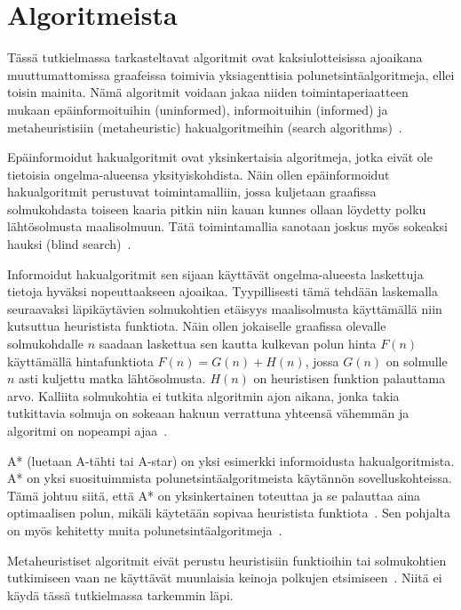 \section{Algoritmeista}\label{algoritmeista}
Tässä tutkielmassa tarkasteltavat algoritmit ovat kaksiulotteisissa 
ajoaikana muuttumattomissa graafeissa toimivia yksiagenttisia 
polunetsintäalgoritmeja, ellei toisin mainita. Nämä algoritmit voidaan jakaa 
niiden toimintaperiaatteen mukaan epäinformoituihin (uninformed), 
informoituihin (informed) ja metaheuristisiin (metaheuristic) 
hakualgoritmeihin (search algorithms)~\cite{applSciLawande}.\par
	Epäinformoidut hakualgoritmit ovat yksinkertaisia algoritmeja, jotka 
eivät ole tietoisia ongelma-alueensa yksityiskohdista. Näin ollen 
epäinformoidut hakualgoritmit perustuvat toimintamalliin, jossa kuljetaan 
graafissa solmukohdasta toiseen kaaria pitkin niin kauan kunnes ollaan 
löydetty polku lähtösolmusta maalisolmuun. Tätä toimintamallia sanotaan 
joskus myös sokeaksi hauksi (blind search)~\cite{applSciLawande}.\par
	Informoidut hakualgoritmit sen sijaan käyttävät ongelma-alueesta 
laskettuja tietoja hyväksi nopeuttaakseen ajoaikaa. Tyypillisesti tämä 
tehdään laskemalla seuraavaksi läpikäytävien solmukohtien etäisyys 
maalisolmusta käyttämällä niin kutsuttua heuristista funktiota. Näin ollen 
jokaiselle graafissa olevalle solmukohdalle $n$ saadaan laskettua sen 
kautta kulkevan polun hinta $F(n)$ käyttämällä hintafunktiota 
$F(n) = G(n) + H(n)$, jossa $G(n)$ on solmulle $n$ asti kuljettu matka 
lähtösolmusta. $H(n)$ on heuristisen funktion palauttama arvo. 
Kalliita solmukohtia ei tutkita algoritmin ajon aikana, jonka takia 
tutkittavia solmuja on sokeaan hakuun verrattuna yhteensä vähemmän ja 
algoritmi on nopeampi ajaa~\cite{applSciLawande}.\par
	A* (luetaan A-tähti tai A-star) on yksi esimerkki informoidusta 
hakualgoritmista. A* on yksi suosituimmista polunetsintäalgoritmeista 
käytännön sovelluskohteissa. Tämä johtuu siitä, että A* on yksinkertainen 
toteuttaa ja se palauttaa aina optimaalisen polun, mikäli käytetään 
sopivaa heuristista funktiota~\cite{MathewAndMalathy}. Sen pohjalta on 
myös kehitetty muita polunetsintäalgoritmeja~\cite{applSciLawande}.\par
	Metaheuristiset algoritmit eivät perustu heuristisiin funktioihin tai 
solmukohtien tutkimiseen vaan ne käyttävät muunlaisia keinoja polkujen 
etsimiseen~\cite{applSciLawande}. Niitä ei käydä tässä tutkielmassa tarkemmin 
läpi.

